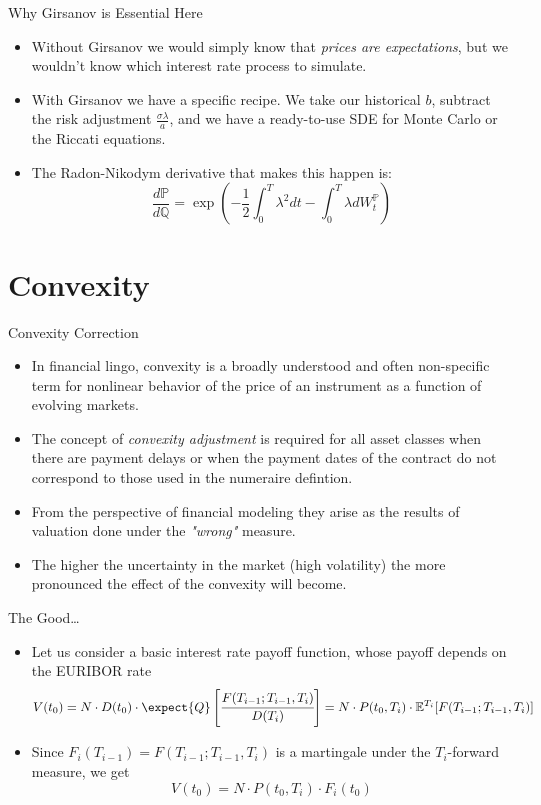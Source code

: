 \documentclass{beamer}
\begin{document}
\begin{frame}{Why Girsanov is Essential Here}
\begin{itemize}
	\item Without Girsanov we would simply know that \emph{prices are expectations}, but we wouldn't know which interest rate process to simulate.
	\item With Girsanov we have a specific recipe. We take our historical $b$, subtract the risk adjustment $\frac{\sigma\lambda}{a}$, and we have a ready-to-use SDE for Monte Carlo or the Riccati equations.
	\item The Radon-Nikodym derivative that makes this happen is:
	\begin{equation*}
	\frac{d\mathbb{P}}{d\mathbb{Q}}=\exp\left(-\frac{1}{2}\int_0^T\lambda^2 dt - \int_0^T\lambda dW_t^\mathbb{P}\right)
	\end{equation*}
\end{itemize}
\end{frame}

\section{Convexity}
\begin{frame}{Convexity Correction}
	\begin{itemize}
		\item<1-> In financial lingo, convexity is a broadly understood and often non-specific term for nonlinear behavior of the price of an instrument as a function of evolving markets.
		\item<2-> The concept of \emph{convexity adjustment} is required for all asset classes when there are payment delays or when the payment dates of the contract do
		not correspond to those used in the numeraire defintion.
		\item<3-> From the perspective of financial modeling they arise as the results of valuation done under the \emph{"wrong"} measure.
		\item<4-> The higher the uncertainty in the market (high volatility) the more pronounced the effect of the convexity will become.
	\end{itemize}
\end{frame}

\begin{frame}{The Good\ldots}
	\begin{itemize}
		\item<1-> Let us consider a basic interest rate payoff function, whose payoff depends on the EURIBOR rate
		\begin{equation*}
			V(t_0) = N\cdot D(t_0)\cdot\expect{Q}\left[\cfrac{F(T_{i-1};T_{i-1},T_i)}{D(T_i)}\right]=
			N\cdot P(t_0,T_i)\cdot\mathbb{E}^{T_i}[F(T_{i-1};T_{i-1},T_i)]
		\end{equation*}
		\item<2-> Since $F_{i}(T_{i-1}) = F(T_{i-1};T_{i-1}, T_i)$ is a martingale under the $T_i$-forward measure, we get
		\begin{equation*}
			V(t_0)= N\cdot P(t_0,T_i)\cdot F_i(t_0)
		\end{equation*}
	\end{itemize}
\end{frame}
\end{document}
